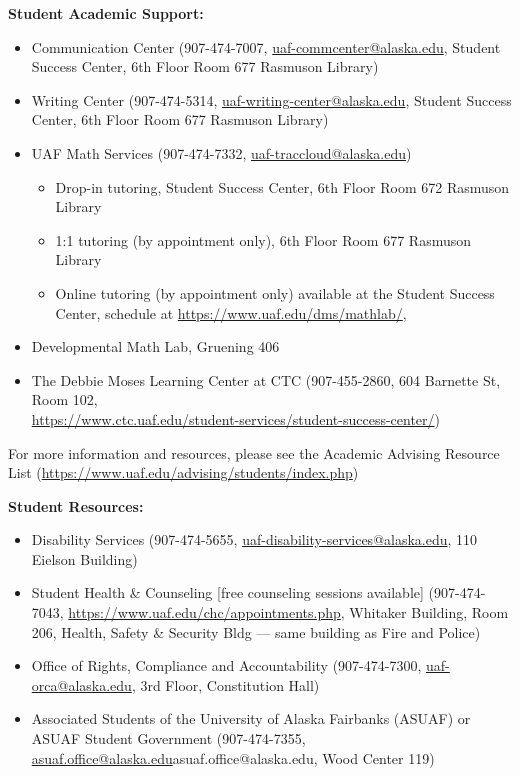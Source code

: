 \documentclass[11pt]{article}
\renewcommand{\emph}[1]{\textsf{\textbf{#1}}}
\def\mailto#1{\href{mailto:#1}{#1}}
\begin{document}
 



\noindent\emph{Student Academic Support:}
\begin{itemize}
\setlength\itemsep{0em}
        \item Communication Center (907-474-7007, \mailto{uaf-commcenter@alaska.edu}, Student Success Center, 6th Floor Room 677 Rasmuson Library)
        \item Writing Center (907-474-5314, \mailto{uaf-writing-center@alaska.edu}, Student Success Center, 6th Floor Room 677 Rasmuson Library)
\item UAF Math Services (907-474-7332, \mailto{uaf-traccloud@alaska.edu})


\begin{itemize}
\item Drop-in tutoring, Student Success Center, 6th Floor Room 672 Rasmuson Library

\item 1:1 tutoring (by appointment only), 6th Floor Room 677 Rasmuson Library

\item Online tutoring (by appointment only)
available at the Student Success Center, schedule at \url{https://www.uaf.edu/dms/mathlab/}, 
\end{itemize}

\item Developmental Math Lab, Gruening 406
\item The Debbie Moses Learning Center at CTC (907-455-2860, 604 Barnette St, Room 102,\\ \url{https://www.ctc.uaf.edu/student-services/student-success-center/})
\end{itemize}

 For more information and resources, please see the Academic Advising Resource List (\url{https://www.uaf.edu/advising/students/index.php})


\noindent\emph{Student Resources:}
\begin{itemize}
\setlength\itemsep{0em}
\item Disability Services (907-474-5655, \mailto{uaf-disability-services@alaska.edu}, 110 Eielson Building)
\item Student Health \& Counseling [free counseling sessions available] (907-474-7043, \url{https://www.uaf.edu/chc/appointments.php}, Whitaker Building, Room 206, Health, Safety \& Security Bldg --- same building as Fire and Police)
\item Office of Rights, Compliance and Accountability (907-474-7300, \mailto{uaf-orca@alaska.edu}, 3rd Floor, Constitution Hall)
\item Associated Students of the University of Alaska Fairbanks (ASUAF) or ASUAF Student Government (907-474-7355, \mailto{asuaf.office@alaska.edu}{asuaf.office@alaska.edu}, Wood Center 119)
\end{itemize}
\end{document}
